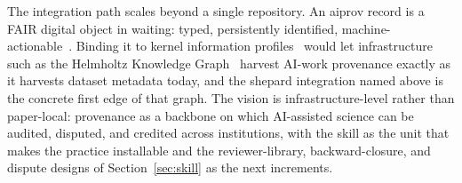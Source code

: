 The integration path scales beyond a single repository. An aiprov
record is a FAIR digital object in waiting: typed, persistently
identified, machine-actionable~\cite{fairdo2020}. Binding it to
kernel information profiles~\cite{hmc-kip2022} would let
infrastructure such as the Helmholtz Knowledge
Graph~\cite{unhide-helmholtz-kg} harvest AI-work provenance exactly
as it harvests dataset metadata today, and the shepard integration
named above is the concrete first edge of that graph. The vision is
infrastructure-level rather than paper-local: provenance as a backbone on
which AI-assisted science can be audited, disputed, and credited
across institutions, with the skill as the unit that makes the
practice installable and the reviewer-library, backward-closure, and
dispute designs of Section~\ref{sec:skill} as the next increments.

